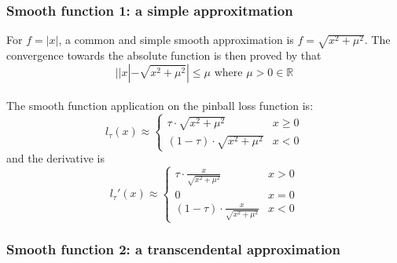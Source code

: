 \subsubsection{Smooth function 1: a simple approxitmation}
\label{subsec: smooth_sqrt}

For $f = |x|$, a common and simple smooth approximation is $
    f = \sqrt{x^2 + \mu^2}
$.
 The convergence towards the absolute function is then proved by \citeauthor{voroninConvolutionBasedSmooth2015a}\cite{voroninConvolutionBasedSmooth2015a} that 
\begin{equation}
    ||x| - \sqrt{x^2 + \mu^2}| \leq \mu \text{  where } \mu > 0 \in \mathbb{R}
\end{equation}
\\
The smooth function application on the pinball loss function is:
\begin{equation}
    l_\tau(x) \approx 
    \begin{cases}
        \tau \cdot \sqrt{x^2 + \mu^2} & {x \geq 0} \\
        (1-\tau) \cdot \sqrt{x^2 + \mu^2} & {x < 0}
    \end{cases}
\end{equation}
and the derivative is
\begin{equation}
    l_\tau\prime(x) \approx 
    \begin{cases}
        \tau \cdot \frac{x}{\sqrt{x^2 + \mu^2}} & {x > 0} \\
        0 & {x=0} \\
        (1-\tau) \cdot \frac{x}{\sqrt{x^2 + \mu^2}} & {x<0}
    \end{cases}
\end{equation}
\subsubsection{Smooth function 2: a transcendental approximation}
\label{subsec: smooth_new}

